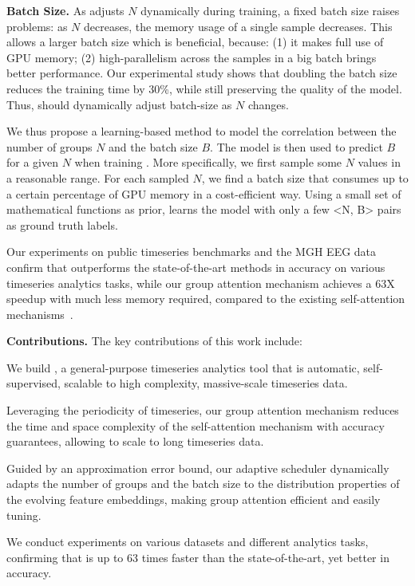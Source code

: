 \textbf{Batch Size.} As \system adjusts $N$ dynamically during training, a fixed batch size raises problems: as $N$ decreases, the memory usage of a single sample decreases. This allows a larger batch size which is beneficial, because: 
(1) it makes full use of GPU memory; (2) high-parallelism across the samples in a big batch brings better performance. 
Our experimental study shows that doubling the batch size reduces the training time by 30\%, while still preserving the quality of the model. Thus, \system should dynamically adjust batch-size as $N$ changes.

We thus propose a learning-based method to model the correlation between the number of groups $N$ and the batch size $B$. The model is then used to predict $B$ for a given $N$ when training \system.
More specifically, we first sample some $N$ values in a reasonable range. For each sampled $N$, we find a batch size that consumes up to a certain percentage of GPU memory in a cost-efficient way. Using a small set of mathematical functions as prior, \system learns the model with only a few <N, B> pairs as ground truth labels.    

Our experiments on public timeseries benchmarks and the MGH EEG data~\cite{DBLP:journals/pvldb/CaoTAJYLGSBSCWM19} confirm that \system outperforms the state-of-the-art methods in accuracy on various timeseries analytics tasks, while our group attention mechanism achieves a 63X speedup with much less memory required, compared to the existing self-attention mechanisms~\cite{DBLP:conf/nips/VaswaniSPUJGKP17,choromanski2020rethinking,wang2020linformer}.

\noindent\textbf{Contributions.} The key contributions of this work include:

\begin{compactitem}
\item We build \system, a general-purpose timeseries analytics tool that is automatic, self-supervised, scalable to high complexity, massive-scale timeseries data.


\item Leveraging the periodicity of timeseries, our group attention mechanism reduces the time and space complexity of the self-attention mechanism with accuracy guarantees, allowing  \system to scale to long timeseries data.

\item Guided by an approximation error bound, our adaptive scheduler dynamically adapts the number of groups and the batch size to the distribution properties of the evolving feature embeddings, making group attention efficient and easily tuning.

\item We conduct experiments on various datasets and different analytics tasks, confirming that \system is up to 63 times faster than the state-of-the-art, yet better in accuracy. 

\end{compactitem}
